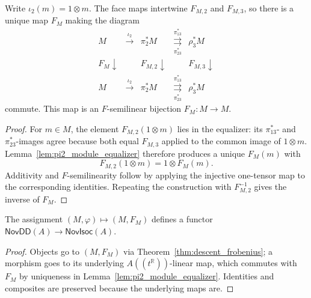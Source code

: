 \begin{theorem}
  \label{thm:descent_frobenius}
  \leanok
  Write $\iota_2(m)=1\otimes m$.  The face maps intertwine $F_{M,2}$ and
  $F_{M,3}$, so there is a unique map $F_M$ making the diagram
  \[
    \begin{array}{ccccc}
      M & \xrightarrow{\iota_2} & \pi_2^\ast M
        & \overset{\pi_{13}^\ast}{\underset{\pi_{23}^\ast}{\rightrightarrows}}
        & \rho_3^\ast M \\
      {\scriptstyle F_M}\!\downarrow && {\scriptstyle F_{M,2}}\!\downarrow
        && {\scriptstyle F_{M,3}}\!\downarrow \\
      M & \xrightarrow{\iota_2} & \pi_2^\ast M
        & \overset{\pi_{13}^\ast}{\underset{\pi_{23}^\ast}{\rightrightarrows}}
        & \rho_3^\ast M
    \end{array}
  \]
  commute.  This map is an $F$-semilinear bijection $F_M\colon M\to M$.
\end{theorem}

\begin{proof}
  \leanok
  For $m\in M$, the element $F_{M,2}(1\otimes m)$ lies in the equalizer:
  its $\pi_{13}^\ast$- and $\pi_{23}^\ast$-images agree because both equal
  $F_{M,3}$ applied to the common image of $1\otimes m$.
  Lemma~\ref{lem:pi2_module_equalizer} therefore produces a unique $F_M(m)$
  with
  \[
    F_{M,2}(1\otimes m)=1\otimes F_M(m).
  \]
  Additivity and $F$-semilinearity follow by applying the injective one-tensor
  map to the corresponding identities.  Repeating the construction with
  $F_{M,2}^{-1}$ gives the inverse of $F_M$.
\end{proof}

\begin{theorem}
  \label{thm:descent_to_isocrystal}
  \leanok
  The assignment $(M, \varphi) \mapsto (M, F_M)$ defines a functor
  $\mathsf{NovDD}(A) \to \mathsf{NovIsoc}(A)$.
\end{theorem}

\begin{proof}
  \leanok
  Objects go to $(M, F_M)$ via Theorem~\ref{thm:descent_frobenius}; a morphism
  goes to its underlying $A((t^{\mathbb{R}}))$-linear map, which commutes with
  $F_M$ by uniqueness in Lemma~\ref{lem:pi2_module_equalizer}.  Identities and
  composites are preserved because the underlying maps are.
\end{proof}

